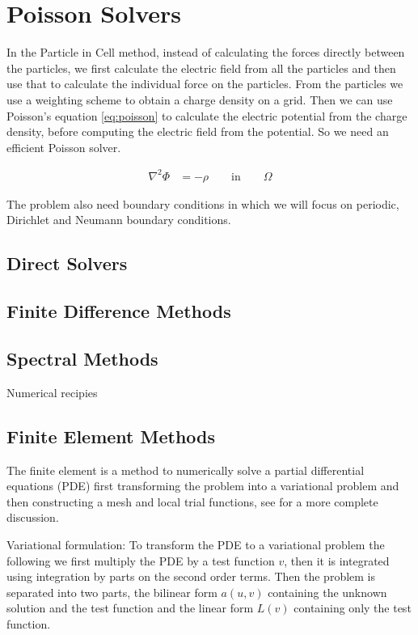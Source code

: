 
	\section{Poisson Solvers}

		In the Particle in Cell method, instead of calculating the forces directly between the particles, we first calculate the electric field from all the particles and then use that to calculate the individual force on the particles. From the particles we use a weighting scheme to obtain a charge density on a grid. Then we can use Poisson's equation \cref{eq:poisson} to calculate the electric potential from the charge density, before computing the electric field from the potential. So we need an efficient Poisson solver.

		\begin{align}
			\nabla ^2 \Phi &= -\rho \qquad \text{in} \qquad \Omega \label{eq:poisson}
		\end{align}

		The problem also need boundary conditions in which we will focus on periodic, Dirichlet and Neumann boundary conditions.

		\subsection{Direct Solvers}


		\subsection{Finite Difference Methods}

		\subsection{Spectral Methods}
			Numerical recipies

		\subsection{Finite Element Methods}
			The finite element is a method to numerically solve a partial differential equations (PDE) first transforming the problem into a variational problem and then constructing a mesh and local trial functions, see \cite{Sandve2011} for a more complete discussion.

			Variational formulation:
			To transform the PDE to a variational problem the following we first multiply the PDE by a test function \(v\), then it is integrated using integration by parts on the second order terms. Then the problem is separated into two parts, the bilinear form \(a(u,v)\) containing the unknown solution and the test function and the linear form \(L(v)\) containing only the test function.

